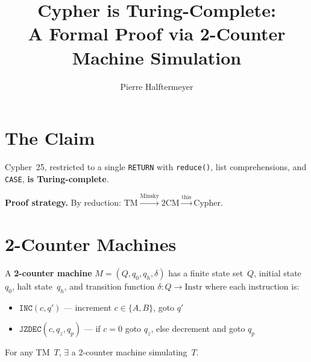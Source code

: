 \documentclass[sigconf, nonacm]{acmart}
\title{Cypher is Turing-Complete: \\
  A Formal Proof via 2-Counter Machine Simulation}
\author{Pierre Halftermeyer}
\affiliation{%
  \institution{Neo4j}
  \country{France}
}
\begin{document}
\maketitle

\section{The Claim}

\begin{claimbox}
Cypher~25, restricted to a single
\texttt{RETURN} with \texttt{reduce()}, list comprehensions, and
\texttt{CASE}, \textbf{is Turing-complete}.
\end{claimbox}

\textbf{Proof strategy.} By reduction:
$\text{TM} \xrightarrow{\text{Minsky}} \text{2CM} \xrightarrow{\text{this}} \text{Cypher}$.

\section{2-Counter Machines}

A \textbf{2-counter machine} $M = (Q, q_0, q_h, \delta)$ has a finite
state set~$Q$, initial state~$q_0$, halt state~$q_h$, and transition
function $\delta: Q \to \text{Instr}$ where each instruction is:

\begin{itemize}[leftmargin=1.2em,nosep]
  \item $\texttt{INC}(c, q')$ --- increment $c \in \{A,B\}$, goto $q'$
  \item $\texttt{JZDEC}(c, q_z, q_p)$ --- if $c{=}0$ goto $q_z$, else
        decrement and goto $q_p$
\end{itemize}

\begin{factbox}
For any TM~$T$, $\exists$ a 2-counter machine simulating~$T$.
\end{factbox}
\end{document}
